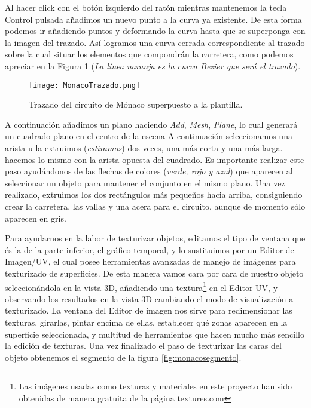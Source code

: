 Al hacer click con el botón izquierdo del ratón mientras mantenemos la tecla Control pulsada añadimos un nuevo punto a la curva ya existente. De esta forma podemos ir añadiendo puntos y deformando la curva hasta que se superponga con la imagen del trazado. Así logramos una curva cerrada correspondiente al trazado sobre la cual situar los elementos que compondrán la carretera, como podemos apreciar en la Figura \ref{fig:monacotrazado} (\textit{La línea naranja es la curva Bezier que será el trazado}).

\begin{figure}[ht]
	\centering
	\texttt{[image: MonacoTrazado.png]}
	\caption{Trazado del circuito de Mónaco superpuesto a la plantilla.} \label{fig:monacotrazado}
\end{figure}

A continuación añadimos un plano haciendo \textit{Add}, \textit{Mesh}, \textit{Plane}, lo cual generará un cuadrado plano en el centro de la escena A continuación seleccionamos una arista u la extruimos (\textit{estiramos}) dos veces, una más corta y una más larga. hacemos lo mismo con la arista opuesta del cuadrado. Es importante realizar este paso ayudándonos de las flechas de colores (\textit{verde, rojo y azul}) que aparecen al seleccionar un objeto para mantener el conjunto en el mismo plano. Una vez realizado, extruimos los dos rectángulos más pequeños hacia arriba, consiguiendo crear la carretera, las vallas y una acera para el circuito, aunque de momento sólo aparecen en gris.

Para ayudarnos en la labor de texturizar objetos, editamos el tipo de ventana que és la de la parte inferior, el gráfico temporal, y lo sustituimos por un Editor de Imagen/UV, el cual posee herramientas avanzadas de manejo de imágenes para texturizado de superficies. De esta manera vamos cara por cara de nuestro objeto seleccionándola en la vista 3D, añadiendo una textura\footnote{Las imágenes usadas como texturas y materiales en este proyecto han sido obtenidas de manera gratuita de la página textures.com\cite{texturescom}} en el Editor UV, y observando los resultados en la vista 3D cambiando el modo de visualización a texturizado. La ventana del Editor de imagen nos sirve para redimensionar las texturas, girarlas, pintar encima de ellas, establecer qué zonas aparecen en la superficie seleccionada, y multitud de herramientas que hacen mucho más sencillo la edición de texturas. Una vez finalizado el paso de texturizar las caras del objeto obtenemos el segmento de la figura \ref{fig:monacosegmento}.


